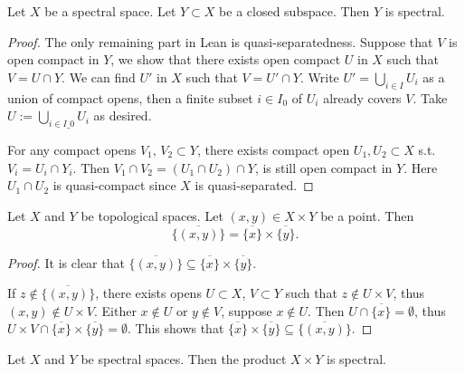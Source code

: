 \begin{lemma}
  \label{thm:closed-subspace-spectral}
  \leanok
  Let $X$ be a spectral space. Let $Y \subset X$ be a closed subspace. Then $Y$ is spectral.
\end{lemma}

\begin{proof}
  \leanok
  The only remaining part in Lean is quasi-separatedness.
  Suppose that \(V\) is open compact in \(Y\), we show that there exists open compact \(U\) in 
  \(X\) such that \(V = U \cap Y\). We can find \(U'\) in \(X\) such that \(V = U' \cap Y\). Write
  \(U' = \bigcup_{i \in I} U_i\) as a union of compact opens, then a finite subset \(i \in I_0\) 
  of \(U_i\) already covers \(V\). Take \(U := \bigcup_{i \in I\_0} U_i\) as desired.
  
  For any compact opens \(V_1,\, V_2 \subset Y\), 
  there exists compact open \(U_1, U_2 \subset X\) s.t. \(V_i = U_i \cap Y_i\). Then 
  \(V_1 \cap V_2 = (U_1 \cap U_2) \cap Y \), is still open compact in \(Y\). Here \(U_1 \cap U_2\)
  is quasi-compact since \(X\) is quasi-separated.
\end{proof}

\begin{lemma}
  \label{thm:closure-product}
  \mathlibok
  Let $X$ and $Y$ be topological spaces. Let $(x, y) \in X \times Y$ be a point. Then 
  \[\overline{\{(x, y)\}} = \overline{\{x\}} \times \overline{\{y\}}.\]
\end{lemma}

\begin{proof}
  \mathlibok
  It is clear that \(\overline{\{(x, y)\}} \subseteq \overline{\{x\}} \times \overline{\{y\}}\).

  If \(z \notin \overline{\{(x, y)\}}\), there exists opens \(U \subset X\), \(V \subset Y\) such that \(z \notin U \times V\), thus \((x, y) \notin U \times V\). Either \(x \notin U\) or \(y \notin V\), suppose \(x \notin U\). Then \(U \cap \overline{\{x\}} = \emptyset\), thus \(U \times V \cap \overline{\{x\}} \times \overline{\{y\}}  = \emptyset\). This shows that \(\overline{\{x\}} \times \overline{\{y\}} \subseteq \overline{\{(x, y)\}}\).
\end{proof}

\begin{lemma}
  \label{thm:spectral-product}
  \leanok
  Let $X$ and $Y$ be spectral spaces. Then the product $X \times Y$ is spectral.
\end{lemma}

